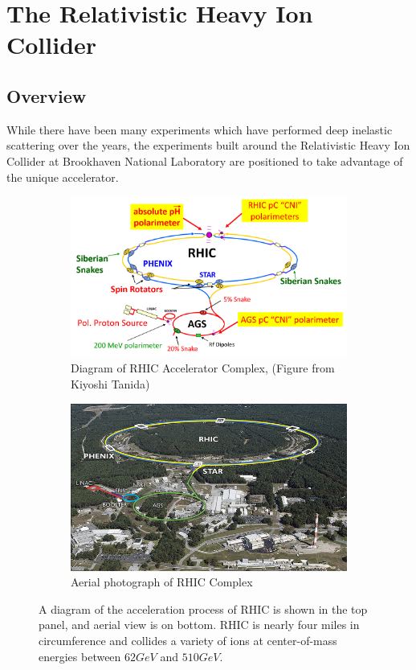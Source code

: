 \chapter{The Relativistic Heavy Ion Collider}

\section{Overview}
While there have been many experiments which have performed deep inelastic
scattering over the years, the experiments built around the Relativistic Heavy
Ion Collider at Brookhaven National Laboratory are positioned to take advantage
of the unique accelerator. 

\begin{figure}[ht]
  \centering
  \begin{subfigure}[b]{\textwidth}
    \centering
    \includegraphics[width=0.8\linewidth]{./figures/kiyoshi_tanida_rhic_schematic.png}
    \caption{Diagram of RHIC Accelerator Complex, (Figure from Kiyoshi Tanida)}
    \label{fig:rhic_schematic} 
  \end{subfigure}
  \begin{subfigure}[b]{\textwidth}
    \centering
    \includegraphics[width=0.8\linewidth]{./figures/7979381212_fddf3f1ab4_z.jpg}
    \caption{Aerial photograph of RHIC Complex \cite{BNLFlickr2011}}
    \label{fig:rhic_aerial}
  \end{subfigure}
  \caption{
    A diagram of the acceleration process of RHIC is shown in the top panel, and
    aerial view is on bottom. RHIC is nearly four miles in circumference and
    collides a variety of ions at center-of-mass energies between $62 GeV$ and
    $510 GeV$.
  }
  \label{fig:rhic_complex}
\end{figure}

